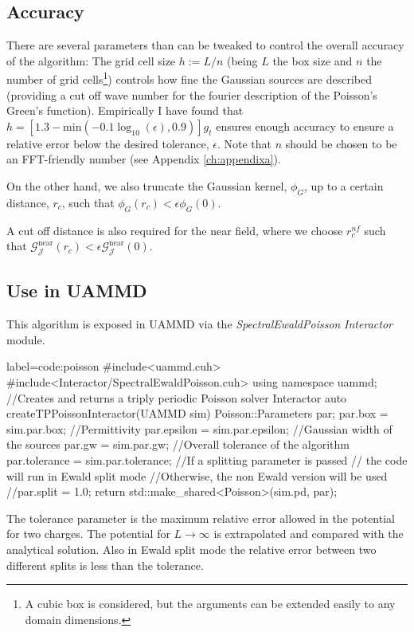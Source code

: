 \documentclass[ twoside,openright,titlepage,numbers=noenddot,%
headinclude,footinclude,cleardoublepage=empty,abstract=on,
BCOR=5mm,paper=b5,fontsize=11pt, dvipsnames
]{scrreprt}
\newcommand{\oper}[1]{\mathcal{#1}}
\newcommand{\uammd}{\gls{UAMMD}\xspace}
\newcommand{\near}{\textrm{near}}
\begin{document}
\subsection*{Accuracy}
There are several parameters than can be tweaked to control the overall accuracy of the algorithm:
The grid cell size $h:=L/n$ (being $L$ the box size and $n$ the number of grid cells\footnote{A cubic box is considered, but the arguments can be extended easily to any domain dimensions.}) controls how fine the Gaussian sources are described (providing a cut off wave number for the fourier description of the Poisson's Green's function). Empirically I have found that $h = \left[1.3 - \text{min}\left(-0.1\log_{10}(\epsilon), 0.9\right)\right]g_t$ ensures enough accuracy to ensure a relative error below the desired tolerance, $\epsilon$.
Note that $n$ should be chosen to be an \gls{FFT}-friendly number (see Appendix \ref{ch:appendixa}).

On the other hand, we also truncate the Gaussian kernel, $\phi_G$, up to a certain distance, $r_c$, such that $\phi_G(r_c)< \epsilon\phi_G(0)$.

A cut off distance is also required for the near field, where we choose $r_c^{nf}$ such that $\oper{G}_{\oper{J}}^{\near}(r_c) < \epsilon\oper{G}_{\oper{J}}^{\near}(0)$.


\subsection*{Use in UAMMD}

This algorithm is exposed in \uammd via the \emph{SpectralEwaldPoisson} \emph{Interactor} module.

\begin{code2}{label=code:poisson}
#include<uammd.cuh>
#include<Interactor/SpectralEwaldPoisson.cuh>
using namespace uammd;
//Creates and returns a triply periodic Poisson solver Interactor
auto createTPPoissonInteractor(UAMMD sim){
  Poisson::Parameters par;
  par.box = sim.par.box;
  //Permittivity
  par.epsilon = sim.par.epsilon;
  //Gaussian width of the sources
  par.gw = sim.par.gw; 
  //Overall tolerance of the algorithm
  par.tolerance = sim.par.tolerance;
  //If a splitting parameter is passed
  // the code will run in Ewald split mode
  //Otherwise, the non Ewald version will be used
  //par.split = 1.0;
  return std::make_shared<Poisson>(sim.pd, par);
}
\end{code2}
The tolerance parameter is the maximum relative error allowed in the potential for two charges. The potential for $L\rightarrow\infty$ is extrapolated and compared with the analytical solution. Also in Ewald split mode the relative error between two different splits is less than the tolerance.
\end{document}
